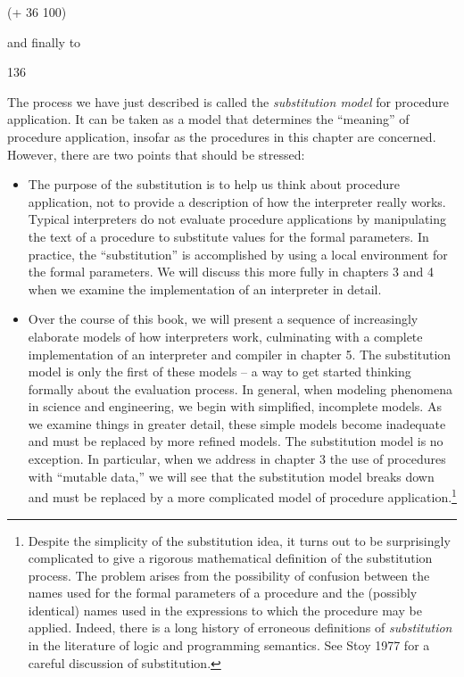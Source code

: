 \begin{schemedisplay}
\begin{schemedisplay}
(+ 36 100)
\end{schemedisplay}

and finally to

\begin{schemedisplay}
136
\end{schemedisplay}

The process we have just described is called the \textit{substitution
model} for procedure application.  It can be taken as a model that
determines the ``meaning'' of procedure application, insofar as the
procedures in this chapter are concerned.  However, there are two
points that should be stressed:

\begin{itemize}
\item The purpose of the substitution is to help us think about procedure
application, not to provide a description of how the interpreter
really works.  Typical interpreters do not evaluate procedure
applications by manipulating the text of a procedure to substitute
values for the formal parameters.  In practice, the ``substitution''
is accomplished by using a local environment for the formal
parameters.  We will discuss this more fully in chapters 3 and 4 when
we examine the implementation of an interpreter in detail.

\item Over the course of this book, we will present a sequence of
  increasingly elaborate models of how interpreters work, culminating
  with a complete implementation of an interpreter and compiler in
  chapter 5.  The substitution model is only the first of these models
  -- a way to get started thinking formally about the evaluation
  process.  In general, when modeling phenomena in science and
  engineering, we begin with simplified, incomplete models.  As we
  examine things in greater detail, these simple models become
  inadequate and must be replaced by more refined models.  The
  substitution model is no exception.  In particular, when we address
  in chapter 3 the use of procedures with ``mutable data,'' we will
  see that the substitution model breaks down and must be replaced by
  a more complicated model of procedure application.\footnote{Despite
    the simplicity of the substitution idea, it turns out to be
    surprisingly complicated to give a rigorous mathematical
    definition of the substitution process.  The problem arises from
    the possibility of confusion between the names used for the formal
    parameters of a procedure and the (possibly identical) names used
    in the expressions to which the procedure may be applied.  Indeed,
    there is a long history of erroneous definitions of
    \textit{substitution} in the literature of logic and programming
    semantics.  See Stoy 1977 for a careful discussion of
    substitution.}
\end{itemize}


\end{schemedisplay}
